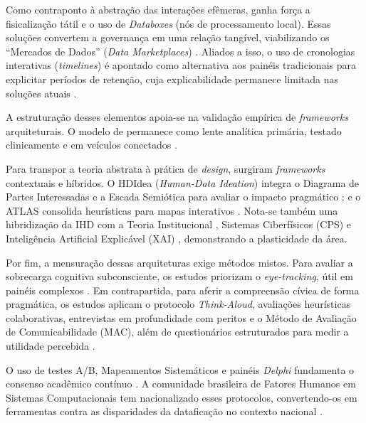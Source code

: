 \documentclass[12pt]{article}
\begin{document}
    Como contraponto à abstração das interações efêmeras, ganha força a fisicalização tátil e o uso de \textit{Databoxes} (nós de processamento local). Essas soluções convertem a governança em uma relação tangível, viabilizando os ``Mercados de Dados'' (\textit{Data Marketplaces}) \cite{Crabtree2016}. Aliados a isso, o uso de cronologias interativas (\textit{timelines}) é apontado como alternativa aos painéis tradicionais para explicitar períodos de retenção, cuja explicabilidade permanece limitada nas soluções atuais \cite{DeAlmeida2019}.

    A estruturação desses elementos apoia-se na validação empírica de \textit{frameworks} arquiteturais. O modelo de \cite{mortier2015humandatainteractionhumanface} permanece como lente analítica primária, testado clinicamente \cite{sailaja2021exploring} e em veículos conectados \cite{DOWTHWAITE2024}. 

    Para transpor a teoria abstrata à prática de \textit{design}, surgiram \textit{frameworks} contextuais e híbridos. O HDIdea (\textit{Human-Data Ideation}) integra o Diagrama de Partes Interessadas e a Escada Semiótica para avaliar o impacto pragmático \cite{Strey2019Human}; e o ATLAS consolida heurísticas para mapas interativos \cite{Capeleti2024Human}. Nota-se também uma hibridização da IHD com a Teoria Institucional \cite{mu2024institutional}, Sistemas Ciberfísicos (CPS) \cite{bavaresco2019technological, Zou2020769} e Inteligência Artificial Explicável (XAI) \cite{Yuan20243615, Turkay2021, durango2024data}, demonstrando a plasticidade da área.

    Por fim, a mensuração dessas arquiteturas exige métodos mistos. Para avaliar a sobrecarga cognitiva subconsciente, os estudos priorizam o \textit{eye-tracking}, útil em painéis complexos \cite{Capeleti2024Human, kaufmann2021ethical}. Em contrapartida, para aferir a compreensão cívica de forma pragmática, os estudos aplicam o protocolo \textit{Think-Aloud}, avaliações heurísticas colaborativas, entrevistas em profundidade com peritos e o Método de Avaliação de Comunicabilidade (MAC), além de questionários estruturados para medir a utilidade percebida \cite{Strey2019Human, Belizario2023Interacao, Capeleti2024Human}. 

    O uso de testes A/B, Mapeamentos Sistemáticos e painéis \textit{Delphi} fundamenta o consenso acadêmico contínuo \cite{calvetti2024human, hayes2024making, Refat2023}. A comunidade brasileira de Fatores Humanos em Sistemas Computacionais tem nacionalizado esses protocolos, convertendo-os em ferramentas contra as disparidades da dataficação no contexto nacional \cite{Capeleti2024Human, Strey2019Human, Belizario2023Interacao}.
\end{document}
